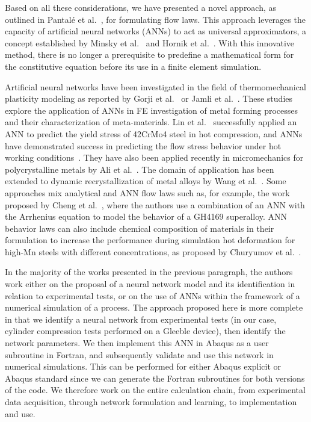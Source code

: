 \documentclass[algorithms,article,accept,pdftex,oneauthor]{Definitions/mdpi}
\begin{document}
Based on all these considerations, we have presented a novel approach, as outlined in Pantalé et al.~\cite{Pantale-2021-EIN, Pantale-2023-DIA}, for formulating flow laws.
This approach leverages the capacity of artificial neural networks (ANNs) to act as universal approximators, a concept established by Minsky et al.~\cite{Minsky-1969-PIC} and Hornik et al.~\cite{Hornik-1989-MFN}.
With this innovative method, there is no longer a prerequisite to predefine a mathematical form for the constitutive equation before its use in a finite element simulation.

Artificial neural networks have been investigated in the field of thermomechanical plasticity modeling as reported by Gorji et al.~\cite{Gorji-2020} or Jamli et al.~\cite{Jamli-2019-SNN}.
These studies explore the application of ANNs in FE investigation of metal forming processes and their characterization of meta-materials.
Lin et al.~\cite{Lin-2008} successfully applied an ANN to predict the yield stress of 42CrMo4 steel in hot compression, and ANNs have demonstrated success in predicting the flow stress behavior under hot working conditions~\cite{Stoffel-2018-ANN, Stoffel-2019-NNB}.
They have also been applied recently in micromechanics for polycrystalline metals by Ali et al.~\cite{Ali-2019-AAN}.
The domain of application has been extended to dynamic recrystallization of metal alloys by Wang et al.~\cite{Wang-2021-ANN}.
Some approaches mix analytical and ANN flow laws such as, for example, the work proposed by Cheng et al.~\cite{Cheng-2022-CWD}, where the authors use a combination of an ANN with the Arrhenius equation to model the behavior of a GH4169 superalloy.
ANN behavior laws can also include chemical composition of materials in their formulation to increase the performance during simulation hot deformation for high-Mn steels with different concentrations, as proposed by Churyumov et al.~\cite{Churyumov-2023-PTS}.

In the majority of the works presented in the previous paragraph, the authors work either on the proposal of a neural network model and its identification in relation to experimental tests, or on the use of ANNs within the framework of a numerical simulation of a process.
The approach proposed here is more complete in that we identify a neural network from experimental tests (in our case, cylinder compression tests performed on a Gleeble device), then identify the network parameters.
We then implement this ANN in Abaqus as a user subroutine in Fortran, and subsequently validate and use this network in numerical simulations.
This can be performed for either Abaqus explicit or Abaqus standard since we can generate the Fortran subroutines for both versions of the code.
We therefore work on the entire calculation chain, from experimental data acquisition, through network formulation and learning, to implementation and use.
\end{document}
